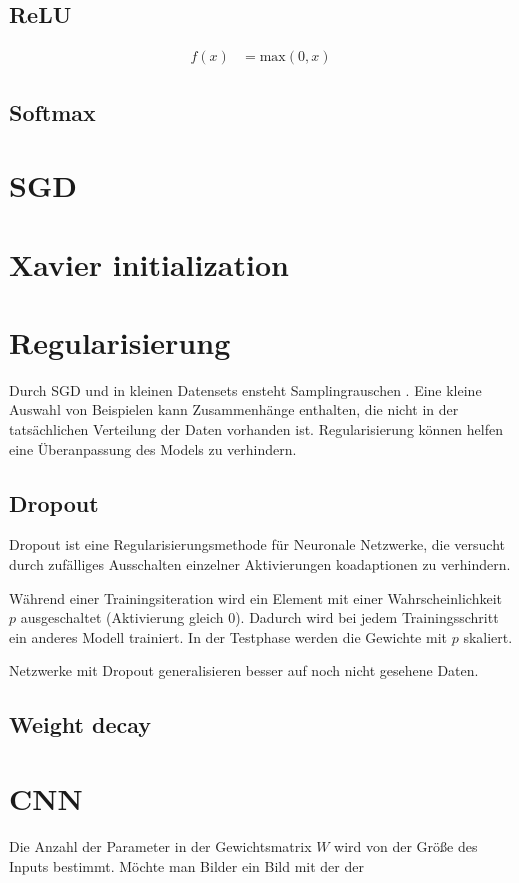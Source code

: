 \subsection{ReLU}
\begin{align}
    f\left(x\right) &= \text{max}(0,x)
\end{align}
\subsection{Softmax}


\section{SGD}
\section{Xavier initialization}
\section{Regularisierung}
\label{sec:Regularisierung}
Durch SGD und in kleinen Datensets ensteht Samplingrauschen . 
Eine kleine Auswahl von Beispielen kann Zusammenhänge enthalten, 
die nicht in der tatsächlichen Verteilung der Daten vorhanden ist.
Regularisierung können helfen eine Überanpassung des Models zu verhindern.
\subsection{Dropout}

Dropout ist eine Regularisierungsmethode für Neuronale Netzwerke, 
die versucht durch zufälliges Ausschalten einzelner Aktivierungen koadaptionen zu verhindern.

Während einer Trainingsiteration wird ein Element mit einer Wahrscheinlichkeit \(p\) ausgeschaltet (Aktivierung gleich 0).
Dadurch wird bei jedem Trainingsschritt ein anderes Modell trainiert. 
In der Testphase werden die Gewichte mit \(p\) skaliert. 

Netzwerke mit Dropout generalisieren besser auf noch nicht gesehene Daten.
\subsection{Weight decay}


\section{CNN}
Die Anzahl der Parameter in der Gewichtsmatrix \(W\) wird von der Größe des Inputs bestimmt.
Möchte man Bilder ein Bild mit der der 

